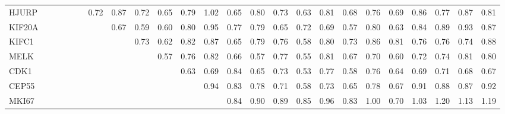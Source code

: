 \begin{longtable}{lrrrrrrrrrrrrrrrrrrrrrrr}
HJURP  &              &            &             &            &             &         0.72 &        0.87 &       0.72 &       0.65 &        0.79 &        1.02 &        0.65 &        0.80 &        0.73 &         0.63 &        0.81 &        0.68 &         0.76 &        0.69 &        0.86 &         0.77 &        0.87 &        0.81 \\
KIF20A &              &            &             &            &             &              &        0.67 &       0.59 &       0.60 &        0.80 &        0.95 &        0.77 &        0.79 &        0.65 &         0.72 &        0.69 &        0.57 &         0.80 &        0.63 &        0.84 &         0.89 &        0.93 &        0.87 \\
KIFC1  &              &            &             &            &             &              &             &       0.73 &       0.62 &        0.82 &        0.87 &        0.65 &        0.79 &        0.76 &         0.58 &        0.80 &        0.73 &         0.86 &        0.81 &        0.76 &         0.76 &        0.74 &        0.88 \\
MELK   &              &            &             &            &             &              &             &            &       0.57 &        0.76 &        0.82 &        0.66 &        0.57 &        0.77 &         0.55 &        0.81 &        0.67 &         0.70 &        0.60 &        0.72 &         0.74 &        0.81 &        0.80 \\
CDK1   &              &            &             &            &             &              &             &            &            &        0.63 &        0.69 &        0.84 &        0.65 &        0.73 &         0.53 &        0.77 &        0.58 &         0.76 &        0.64 &        0.69 &         0.71 &        0.68 &        0.67 \\
CEP55  &              &            &             &            &             &              &             &            &            &             &        0.94 &        0.83 &        0.78 &        0.71 &         0.58 &        0.73 &        0.65 &         0.78 &        0.67 &        0.91 &         0.88 &        0.87 &        0.92 \\
MKI67  &              &            &             &            &             &              &             &            &            &             &             &        0.84 &        0.90 &        0.89 &         0.85 &        0.96 &        0.83 &         1.00 &        0.70 &        1.03 &         1.20 &        1.13 &        1.19 \\

\end{longtable}
